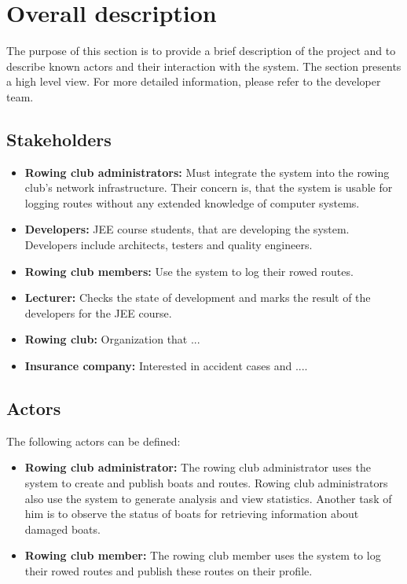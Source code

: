 \section{Overall description}
The purpose of this section is to provide a brief description of the project and to describe known actors and their interaction with the system. The section presents a high level view. For more detailed information, please refer to the developer team.

	\subsection{Stakeholders}
	\begin{itemize}
		\item \textbf{Rowing club administrators:} Must integrate the system into the rowing club's network infrastructure. Their concern is, that the system is usable for logging routes without any extended knowledge of computer systems.
		\item \textbf{Developers:} JEE course students, that are developing the system. Developers include architects, testers and quality engineers.
		\item \textbf{Rowing club members:} Use the system to log their rowed routes.
		\item \textbf{Lecturer:} Checks the state of development and marks the result of the developers for the JEE course.
		\item \textbf{Rowing club:} Organization that ...
		\item \textbf{Insurance company:} Interested in accident cases and ....
	\end{itemize}
	
	\subsection{Actors}
	The following actors can be defined:\\
	
	\begin{itemize}
		\item \textbf{Rowing club administrator:} The rowing club administrator uses the system to create and publish boats and routes. Rowing club administrators also use the system to generate analysis and view statistics. Another task of him is to observe the status of boats for retrieving information about damaged boats.
		\item \textbf{Rowing club member:} The rowing club member uses the system to log their rowed routes and publish these routes on their profile.
	\end{itemize}
	
